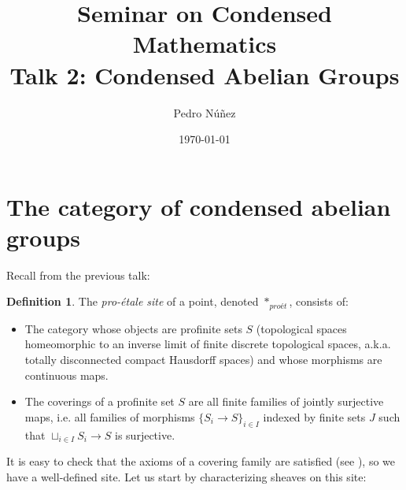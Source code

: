 \documentclass[11pt,A4]{article}
\title{Seminar on Condensed Mathematics \\ \large Talk 2: Condensed Abelian Groups}
\author{Pedro Núñez}
\date{\today}
\theoremstyle{plain}
\theoremstyle{definition}
\newtheorem{defn}[thm]{Definition}
\theoremstyle{remark}
\newcommand{\1}{\mathbbm{1}}
\begin{document}
\maketitle

\tableofcontents

\section{The category of condensed abelian groups}

Recall from the previous talk:

\begin{defn}
    The \textit{pro-étale site} of a point, denoted $*_{proét}$, consists of:
    \begin{itemize}
	\item The category whose objects are profinite sets $S$ (topological spaces homeomorphic to an inverse limit of finite discrete topological spaces, a.k.a. totally disconnected compact Hausdorff spaces) and whose morphisms are continuous maps.
	\item The coverings of a profinite set $S$ are all finite families of jointly surjective maps, i.e. all families of morphisms $\{ S_{i}\to S\}_{i\in I}$ indexed by finite sets $J$ such that $\sqcup_{i\in I}S_{i}\to S$ is surjective.
    \end{itemize}
\end{defn}

It is easy to check that the axioms of a covering family are satisfied (see \cite[\href{https://stacks.math.columbia.edu/tag/00VH}{Tag 00VH}]{sta19}), so we have a well-defined site.
Let us start by characterizing sheaves on this site:
\end{document}
